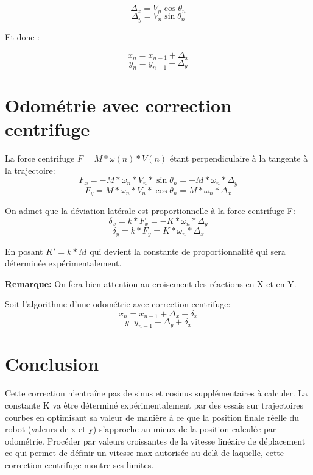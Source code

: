 \documentclass[a4paper]{report}
\begin{document}
\begin{equation}
\Delta_x = V_n \cos\theta_n
\end{equation}
\begin{equation}
\Delta_y = V_n \sin\theta_n
\end{equation}

Et donc :

\begin{equation}
x_n = x_{n-1} + \Delta_x
\end{equation}
\begin{equation}
y_n = y_{n-1} + \Delta_y
\end{equation}

\section{Odométrie avec correction centrifuge}

La force centrifuge $F=M*\omega(n)*V(n)$ étant perpendiculaire à la tangente à la trajectoire:
\begin{equation}
F_x= -M*\omega_n*V_n*\sin\theta_n = -M*\omega_n*\Delta_y
\end{equation}
\begin{equation}
F_y= M* \omega_n*V_n*\cos\theta_n = M* \omega_n*\Delta_x
\end{equation}

On admet que la déviation latérale est proportionnelle à la force centrifuge F:
\begin{equation}
\delta_x = k*F_x = -K* \omega_n*\Delta_y
\end{equation}
\begin{equation}
\delta_y= k*F_y = K* \omega_n*\Delta_x
\end{equation}

En posant $K'=k*M$ qui devient la constante de proportionnalité qui sera déterminée expérimentalement.

\textbf{Remarque:} On fera bien attention au croisement des réactions en X et en Y.

Soit l'algorithme d'une odométrie avec correction centrifuge:
\begin{equation}
x_n = x_{n-1} + \Delta_x + \delta_x
\end{equation}
\begin{equation}
y_ = y_{n-1} + \Delta_y + \delta_x
\end{equation}

\section{Conclusion}
Cette correction n'entraîne pas de sinus et cosinus supplémentaires à calculer.
La constante K va être déterminé expérimentalement par des essais sur trajectoires courbes en optimisant sa valeur de manière à ce que la position finale réelle du robot (valeurs de x et y) s'approche au mieux de la position calculée par odométrie.
Procéder par valeurs croissantes de la vitesse linéaire de déplacement ce qui permet de définir un vitesse max autorisée au delà de laquelle, cette correction centrifuge montre ses limites.
\end{document}
